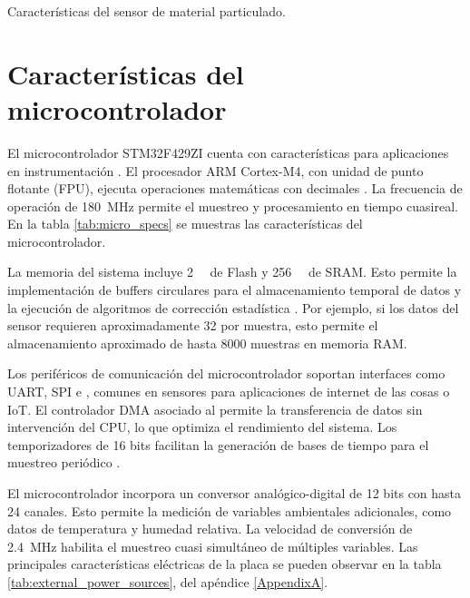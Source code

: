 \begin{table}[h]
	\centering
	\small
	\caption{Características del sensor de material particulado.}
	\label{tab:sensor_caracteristicas}

\end{table}


 \pagebreak






\section{Características del microcontrolador}

El microcontrolador STM32F429ZI cuenta con características para aplicaciones en instrumentación \cite{Yang2022, Wu2018}. El procesador ARM Cortex-M4, con unidad de punto flotante (FPU), ejecuta operaciones matemáticas con decimales \citep{ST2024reference}. La frecuencia de operación de \SI{180}{\mega\hertz} permite el muestreo y procesamiento en tiempo cuasireal. En la tabla \ref{tab:micro_specs} se muestras las características del microcontrolador. 

La memoria del sistema incluye \SI{2}{\mega\byte} de Flash y \SI{256}{\kilo\byte} de SRAM. Esto permite la implementación de buffers circulares para el almacenamiento temporal de datos y la ejecución de algoritmos de corrección estadística \cite{Gunther2014}. Por ejemplo, si los datos del sensor requieren aproximadamente \SI{32}{\byte} por muestra, esto permite el almacenamiento aproximado de hasta \num{8000} muestras en memoria RAM.

Los periféricos de comunicación del microcontrolador soportan interfaces como UART, SPI e \IIC, comunes en sensores para aplicaciones de internet de las cosas o IoT. El controlador DMA asociado al \IIC permite la transferencia de datos sin intervención del CPU, lo que optimiza el rendimiento del sistema. Los temporizadores de 16 bits facilitan la generación de bases de tiempo para el muestreo periódico \citep{ST2024datasheet}.

El microcontrolador incorpora un conversor analógico-digital de 12 bits con hasta 24 canales. Esto permite la medición de variables ambientales adicionales, como datos de temperatura y humedad relativa. La velocidad de conversión de \SI{2.4}{\mega\hertz} habilita el muestreo cuasi simultáneo de múltiples variables.
Las principales características eléctricas de la placa se pueden observar en la tabla \ref{tab:external_power_sources}, del apéndice \ref{AppendixA}.

